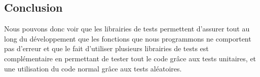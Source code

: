\subsection{Conclusion}

Nous pouvons donc voir que les librairies de tests permettent d'assurer tout au long du développement que les fonctions que nous programmons ne comportent pas d'erreur et que le fait d'utiliser plusieurs librairies de tests est complémentaire en permettant de tester tout le code grâce aux tests unitaires, et une utilisation du code normal grâce aux tests aléatoires.